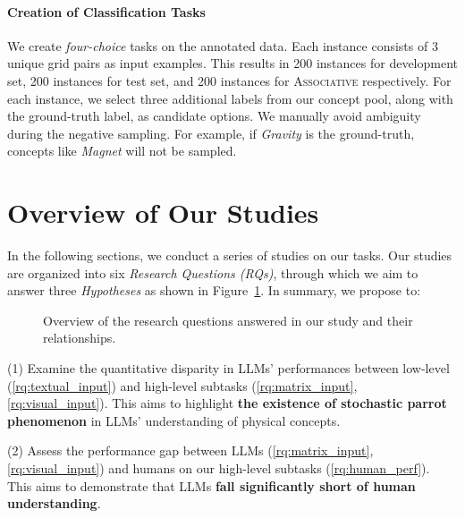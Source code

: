  

\paragraph{Creation of Classification Tasks}


We create \emph{four-choice} tasks on the annotated data. Each instance consists of 3 unique grid pairs as input examples.
This results in 200 instances for \coredataset development set, 200 instances for \coredataset test set, and 200 instances for \textsc{Associative} respectively.
For each instance, we select three additional labels from our concept pool, along with the ground-truth label, as candidate options.
We manually avoid ambiguity during the negative sampling. For example, if \emph{Gravity} is the ground-truth, concepts like \emph{Magnet} will not be sampled.




\section{Overview of Our Studies}
\label{sec:overview}
In the following sections, we conduct a series of studies on our \datasetname tasks. Our studies are organized into six \emph{Research Questions (RQs)}, through which we aim to answer three \emph{Hypotheses} as shown in Figure~\ref{fig:research_overview}.
In summary, we propose to:
\begin{figure}[t!]
\centering
\vspace{-0.05in}
\vspace{-0.2in}
\caption{Overview of the research questions answered in our study and their relationships.}
\label{fig:research_overview}
\vspace{-0.2in}
\end{figure}



(1) Examine the quantitative disparity in LLMs' performances between low-level (\ref{rq:textual_input}) and high-level subtasks (\ref{rq:matrix_input}, \ref{rq:visual_input}). 
This aims to highlight \textbf{the existence of stochastic parrot phenomenon} in LLMs' understanding of physical concepts.

(2) Assess the performance gap between LLMs (\ref{rq:matrix_input}, \ref{rq:visual_input}) and humans on our high-level subtasks (\ref{rq:human_perf}). This aims to demonstrate that LLMs \textbf{fall significantly short of human understanding}.

